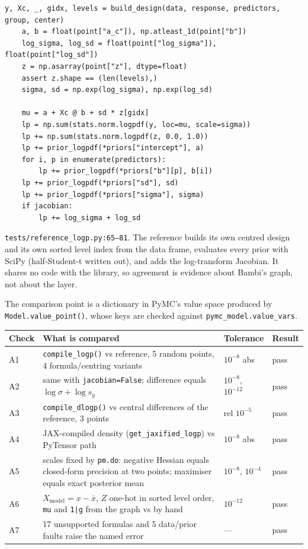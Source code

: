 \documentclass[11pt]{article}
\newcommand{\code}[1]{\texttt{#1}}
\newcommand{\file}[1]{\texttt{#1}}
\newcommand{\sbstext}[1]{\hfill\begin{minipage}[t]{0.42\textwidth}\small #1\end{minipage}}
\begin{document}
\begin{minipage}[t]{0.54\textwidth}\begin{lstlisting}[firstnumber=65]
    y, Xc, _, gidx, levels = build_design(data, response, predictors, group, center)
    a, b = float(point["a_c"]), np.atleast_1d(point["b"])
    log_sigma, log_sd = float(point["log_sigma"]), float(point["log_sd"])
    z = np.asarray(point["z"], dtype=float)
    assert z.shape == (len(levels),)
    sigma, sd = np.exp(log_sigma), np.exp(log_sd)

    mu = a + Xc @ b + sd * z[gidx]
    lp = np.sum(stats.norm.logpdf(y, loc=mu, scale=sigma))
    lp += np.sum(stats.norm.logpdf(z, 0.0, 1.0))
    lp += prior_logpdf(*priors["intercept"], a)
    for i, p in enumerate(predictors):
        lp += prior_logpdf(*priors["b"][p], b[i])
    lp += prior_logpdf(*priors["sd"], sd)
    lp += prior_logpdf(*priors["sigma"], sigma)
    if jacobian:
        lp += log_sigma + log_sd
\end{lstlisting}\end{minipage}
\sbstext{\file{tests/reference\_logp.py:65--81}. The reference builds its own centred
design and its own sorted level index from the data frame, evaluates every prior with
SciPy (half-Student-t written out), and adds the log-transform Jacobian. It shares no code
with the library, so agreement is evidence about Bambi's graph, not about the layer.

The comparison point is a dictionary in PyMC's value space produced by
\code{Model.value\_point()}, whose keys are checked against \code{pymc\_model.value\_vars}.}

\medskip
\begin{center}\footnotesize
\begin{tabular}{lp{}ll}
\toprule
Check & What is compared & Tolerance & Result \\
\midrule
A1 & \code{compile\_logp()} vs reference, 5 random points, 4 formula/centring variants & $10^{-8}$ abs & pass \\
A2 & same with \code{jacobian=False}; difference equals $\log\sigma+\log s_g$ & $10^{-8}$, $10^{-12}$ & pass \\
A3 & \code{compile\_dlogp()} vs central differences of the reference, 3 points & rel $10^{-5}$ & pass \\
A4 & JAX-compiled density (\code{get\_jaxified\_logp}) vs PyTensor path & $10^{-8}$ abs & pass \\
A5 & scales fixed by \code{pm.do}: negative Hessian equals closed-form precision at two points; maximiser equals exact posterior mean & $10^{-8}$, $10^{-4}$ & pass \\
A6 & $X_\text{model} = x-\bar x$, $Z$ one-hot in sorted level order, \code{mu} and \code{1|g} from the graph vs by hand & $10^{-12}$ & pass \\
A7 & 17 unsupported formulas and 5 data/prior faults raise the named error & --- & pass \\
\bottomrule
\end{tabular}
\end{center}
\end{document}
